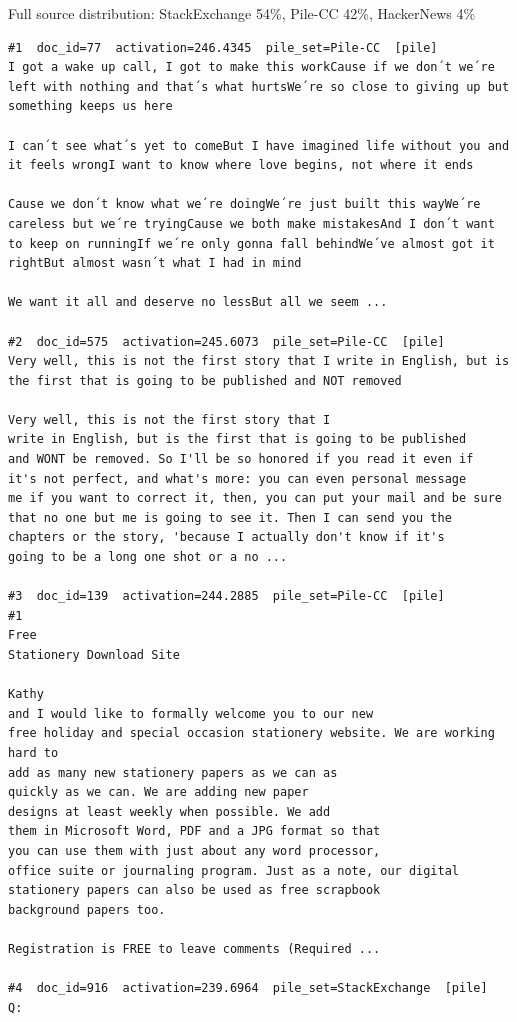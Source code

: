 Full source distribution: StackExchange 54\%, Pile-CC 42\%, HackerNews 4\%

\begin{verbatim}
#1  doc_id=77  activation=246.4345  pile_set=Pile-CC  [pile]
I got a wake up call, I got to make this workCause if we don´t we´re left with nothing and that´s what hurtsWe´re so close to giving up but something keeps us here

I can´t see what´s yet to comeBut I have imagined life without you and it feels wrongI want to know where love begins, not where it ends

Cause we don´t know what we´re doingWe´re just built this wayWe´re careless but we´re tryingCause we both make mistakesAnd I don´t want to keep on runningIf we´re only gonna fall behindWe´ve almost got it rightBut almost wasn´t what I had in mind

We want it all and deserve no lessBut all we seem ...

#2  doc_id=575  activation=245.6073  pile_set=Pile-CC  [pile]
Very well, this is not the first story that I write in English, but is the first that is going to be published and NOT removed

Very well, this is not the first story that I
write in English, but is the first that is going to be published
and WONT be removed. So I'll be so honored if you read it even if
it's not perfect, and what's more: you can even personal message
me if you want to correct it, then, you can put your mail and be sure
that no one but me is going to see it. Then I can send you the
chapters or the story, 'because I actually don't know if it's
going to be a long one shot or a no ...

#3  doc_id=139  activation=244.2885  pile_set=Pile-CC  [pile]
#1
Free
Stationery Download Site

Kathy
and I would like to formally welcome you to our new
free holiday and special occasion stationery website. We are working hard to
add as many new stationery papers as we can as
quickly as we can. We are adding new paper
designs at least weekly when possible. We add
them in Microsoft Word, PDF and a JPG format so that
you can use them with just about any word processor,
office suite or journaling program. Just as a note, our digital
stationery papers can also be used as free scrapbook
background papers too.

Registration is FREE to leave comments (Required ...

#4  doc_id=916  activation=239.6964  pile_set=StackExchange  [pile]
Q:


\end{verbatim}
